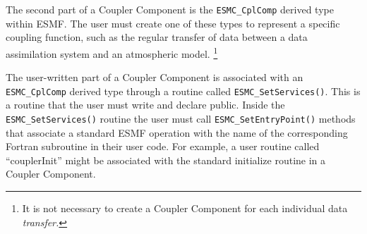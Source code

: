 The second part of a Coupler Component is the {\tt ESMC\_CplComp}
derived type within ESMF.  The user must create one of these types
to represent a specific coupling function, such as the regular
transfer of data between a data assimilation system and an 
atmospheric model.  \footnote{It is not necessary to create 
a Coupler Component for each individual data {\it transfer.}}

The user-written part of a Coupler Component is associated with an
{\tt ESMC\_CplComp} derived type through a routine called 
{\tt ESMC\_SetServices()}.
This is a routine that the user must write and declare public.
Inside the {\tt ESMC\_SetServices()} routine the user must call 
{\tt ESMC\_SetEntryPoint()} methods that associate a standard ESMF 
operation with the name of the corresponding Fortran subroutine in 
their user code.  For example, a user routine called ``couplerInit''
might be associated with the standard initialize routine in a 
Coupler Component.
